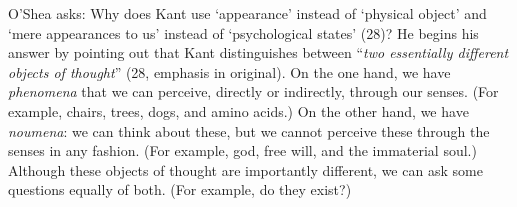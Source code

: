 \documentclass[12pt,letterpaper]{article}
\begin{document}
O'Shea asks: Why does Kant use `appearance' instead of `physical object' and `mere appearances to us' instead of `psychological states' (28)?
He begins his answer by pointing out that Kant distinguishes between ``\textit{two essentially different objects of thought}'' (28, emphasis in original).
On the one hand, we have \textit{phenomena} that we can perceive, directly or indirectly, through our senses.
(For example, chairs, trees, dogs, and amino acids.)
On the other hand, we have \textit{noumena}: we can think about these, but we cannot perceive these through the senses in any fashion.
(For example, god, free will, and the immaterial soul.)
Although these objects of thought are importantly different, we can ask some questions equally of both.
(For example, do they exist?)

\newpage
\pagestyle{references}

\printbibliography[filter=primary,title={Primary Sources}]
\printbibliography[filter=secondary,title={Secondary Sources}]
\end{document}
